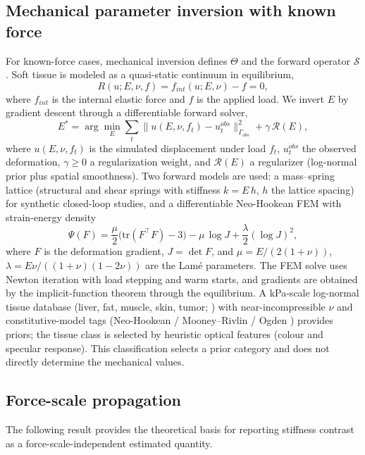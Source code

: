 \documentclass[smallextended]{svjour3}
\begin{document}
\subsection{Mechanical parameter inversion with known force}
\label{sec:tier3}
For known-force cases, mechanical inversion defines $\Theta$ and the
forward operator $\mathcal{S}$. Soft tissue
is modeled as a quasi-static continuum in equilibrium,
\begin{equation}
R(u; E, \nu, f) = f_{int}(u; E, \nu) - f = 0,
\label{eq:equilibrium}
\end{equation}
where $f_{int}$ is the internal elastic force and $f$ is the applied load.
We invert $E$ by gradient descent through a differentiable forward
solver,
\begin{equation}
E^* = \arg\min_{E} \sum_{t} \big\| u(E, \nu, f_t) - u_t^{obs} \big\|_{\Gamma_{obs}}^{2} + \gamma\,\mathcal{R}(E),
\label{eq:inversion}
\end{equation}
where $u(E,\nu,f_t)$ is the simulated displacement under load $f_t$,
$u_t^{obs}$ the observed deformation, $\gamma \ge 0$ a regularization
weight, and $\mathcal{R}(E)$ a regularizer
(log-normal prior plus spatial smoothness). Two forward models are used: a
mass--spring lattice (structural and shear springs with stiffness
$k = E\,h$, $h$ the lattice spacing) for synthetic closed-loop studies, and
a differentiable Neo-Hookean FEM \cite{holzapfel2000,ogden1997,fung1993}
with strain-energy density
\begin{equation}
\Psi(F) = \frac{\mu}{2}\big(\mathrm{tr}(F^{\top}F) - 3\big) - \mu\,\log J + \frac{\lambda}{2}(\log J)^2,
\label{eq:neohookean}
\end{equation}
where $F$ is the deformation gradient, $J = \det F$, and
$\mu = E/(2(1+\nu))$, $\lambda = E\nu/((1+\nu)(1-2\nu))$ are the Lam\'e
parameters. The FEM solve uses Newton iteration with load stepping and warm
starts, and gradients are obtained by the implicit-function theorem through
the equilibrium. A kPa-scale log-normal tissue database (liver, fat,
muscle, skin, tumor; ) with near-incompressible $\nu$
and constitutive-model tags (Neo-Hookean / Mooney--Rivlin
\cite{rivlin1948} / Ogden \cite{ogden1997}) provides priors; the tissue
class is selected by heuristic optical features (colour and specular
response). This classification selects a prior category and does not
directly determine the mechanical values.



\subsection{Force-scale propagation}
\label{sec:forcescale}
The following result provides the theoretical basis for reporting
stiffness contrast as a force-scale-independent estimated quantity.
\end{document}

